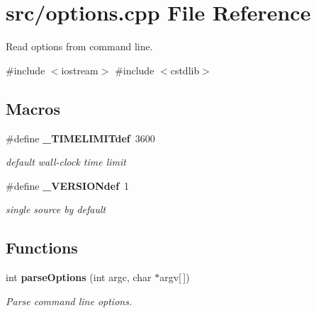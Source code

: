 \section{src/options.cpp File Reference}
\label{options_8cpp}


Read options from command line.  


{\ttfamily \#include $<$iostream$>$}\newline
{\ttfamily \#include $<$cstdlib$>$}\newline
\subsection*{Macros}
\begin{DoxyCompactItemize}
\item 
\#define \textbf{ \+\_\+\+T\+I\+M\+E\+L\+I\+M\+I\+Tdef}~3600
\begin{DoxyCompactList}\small\item\em default wall-\/clock time limit \end{DoxyCompactList}\item 
\#define \textbf{ \+\_\+\+V\+E\+R\+S\+I\+O\+Ndef}~1
\begin{DoxyCompactList}\small\item\em single source by default \end{DoxyCompactList}\end{DoxyCompactItemize}
\subsection*{Functions}
\begin{DoxyCompactItemize}
\item 
int \textbf{ parse\+Options} (int argc, char $\ast$argv[$\,$])
\begin{DoxyCompactList}\small\item\em Parse command line options. \end{DoxyCompactList}\end{DoxyCompactItemize}
